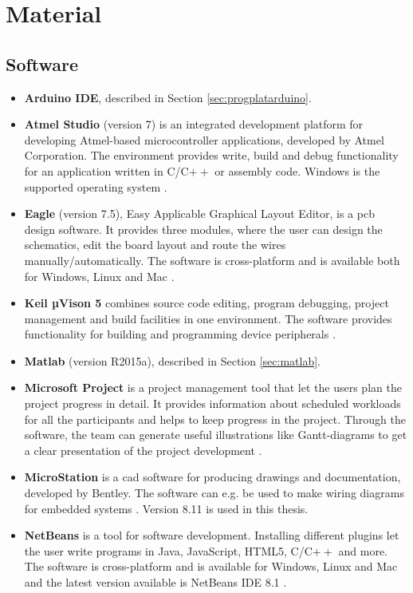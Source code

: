 \chapter{Material}

\section{Software}
\label{sec:software}
\begin{itemize}
    \item \textbf{Arduino IDE}, described in Section \ref{sec:progplatarduino}.
    \item \textbf{Atmel Studio} (version 7) is an integrated development platform for developing Atmel-based microcontroller applications, developed by Atmel Corporation. The environment provides write, build and debug functionality for an application written in C/C$++$ or assembly code. Windows is the supported operating system \cite{atmel}. 
    \item \textbf{Eagle} (version 7.5), Easy Applicable Graphical Layout Editor, is a \acrfull{pcb} design software. It provides three modules, where the user can design the schematics, edit the board layout and route the wires manually/automatically. The software is cross-platform and is available both for Windows, Linux and Mac \cite{eagle}.
    \item \textbf{Keil µVison 5} combines source code editing, program debugging, project management and build facilities in one environment. The software provides functionality for building and programming device peripherals \cite{uvision}. 
    \item \textbf{Matlab} (version R2015a), described in Section \ref{sec:matlab}.
    \item \textbf{Microsoft Project} is a project management tool that let the users plan the project progress in detail. It provides information about scheduled workloads for all the participants and helps to keep progress in the project. Through the software, the team can generate useful illustrations like Gantt-diagrams to get a clear presentation of the project development \cite{msproject}.
    \item \textbf{MicroStation} is a \acrfull{cad} software for producing drawings and documentation, developed by Bentley. The software can e.g. be used to make wiring diagrams for embedded systems \cite{microstation}. Version 8.11 is used in this thesis.
    \item \textbf{NetBeans} is a tool for software development. Installing different plugins let the user write programs in Java, JavaScript, HTML5, C/C$++$ and more. The software is cross-platform and is available for Windows, Linux and Mac and the latest version available is NetBeans IDE 8.1 \cite{netbeans}.

\end{itemize}
